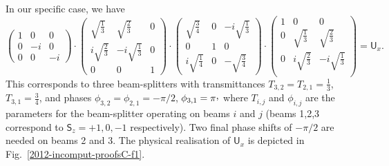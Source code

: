 \documentclass[%
 preprint,
 showpacs,
 showkeys,
 amsmath,
 amssymb,
 aps,
 pra,
 ]{revtex4-1}
\theoremstyle{definition}
\begin{document}
In our specific case, we have
\begin{equation}
	\begin{pmatrix}
	1 & 0 & 0\\
	0 & -i & 0\\
	0 & 0 & -i
	\end{pmatrix}
	\cdot
	\begin{pmatrix}
	\sqrt{\frac{1}{3}} & \sqrt{\frac{2}{3}} & 0\\
	i\sqrt{\frac{2}{3}} & -i\sqrt{\frac{1}{3}} & 0\\
	0 & 0 & 1
	\end{pmatrix}
	\cdot
	\begin{pmatrix}
	\sqrt{\frac{3}{4}} & 0 & -i\sqrt{\frac{1}{3}}\\
	0 & 1 & 0\\
	i\sqrt{\frac{1}{4}} & 0 & -\sqrt{\frac{3}{4}}
	\end{pmatrix}
	\cdot
	\begin{pmatrix}
	1 & 0 & 0\\
	0 & \sqrt{\frac{1}{3}} & \sqrt{\frac{2}{3}}\\
	0 & i\sqrt{\frac{2}{3}} & -i\sqrt{\frac{1}{3}}\\
	\end{pmatrix}
	=\textsf{U}_x.
\end{equation}
This corresponds to three beam-splitters with transmittances $T_{3,2}=T_{2,1}=\frac{1}{3}$, $T_{3,1}=\frac{3}{4}$, and phases $\phi_{3,2}=\phi_{2,1}=-\pi/2$, $\phi_{3,1}=\pi \raisebox{.8mm}{,}$
where $T_{i,j}$ and $\phi_{i,j}$ are the parameters for the beam-splitter operating on beams $i$ and $j$ (beams 1,2,3 correspond to $\textsf{S}_z=+1,0,-1$ respectively).
Two final phase shifts of $-\pi/2$ are needed on beams 2 and 3.
The physical realisation of $\textsf{U}_x$ is depicted in Fig.~\ref{2012-incomput-proofsC-f1}.
\end{document}
